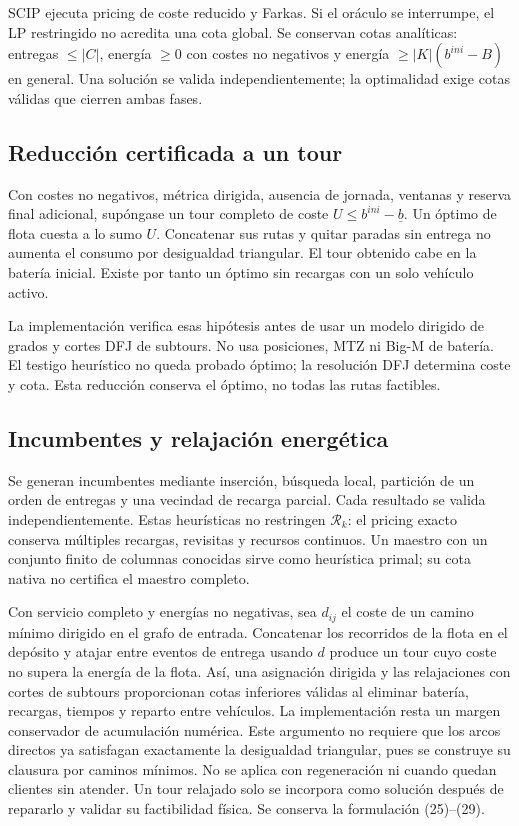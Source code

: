 \documentclass[11pt,a4paper]{article}
\newcommand{\reserve}{\underline b}
\begin{document}
SCIP ejecuta pricing de coste reducido y Farkas. Si el oráculo se interrumpe,
el LP restringido no acredita una cota global. Se conservan cotas analíticas:
entregas $\le |C|$, energía $\ge0$ con costes no negativos y
energía $\ge |K|(b^{ini}-B)$ en general. Una solución se valida independientemente;
la optimalidad exige cotas válidas que cierren ambas fases.

\subsection{Reducción certificada a un tour}
Con costes no negativos, métrica dirigida, ausencia de jornada, ventanas y
reserva final adicional, supóngase un tour completo de coste
$U\le b^{ini}-\reserve$. Un óptimo de flota cuesta a lo sumo $U$.
Concatenar sus rutas y quitar paradas sin entrega no aumenta el consumo por
desigualdad triangular. El tour obtenido cabe en la batería inicial.
Existe por tanto un óptimo sin recargas con un solo vehículo activo.

La implementación verifica esas hipótesis antes de usar un modelo dirigido
de grados y cortes DFJ de subtours. No usa posiciones, MTZ ni Big-M de batería.
El testigo heurístico no queda probado óptimo; la resolución DFJ determina
coste y cota. Esta reducción conserva el óptimo, no todas las rutas factibles.

\subsection{Incumbentes y relajación energética}
Se generan incumbentes mediante inserción, búsqueda local, partición de un
orden de entregas y una vecindad de recarga parcial. Cada resultado se valida
independientemente. Estas heurísticas no restringen $\mathcal R_k$: el pricing
exacto conserva múltiples recargas, revisitas y recursos continuos.
Un maestro con un conjunto finito de columnas conocidas sirve como heurística
primal; su cota nativa no certifica el maestro completo.

Con servicio completo y energías no negativas, sea $d_{ij}$ el coste de un
camino mínimo dirigido en el grafo de entrada. Concatenar los recorridos de
la flota en el depósito y atajar entre eventos de entrega usando $d$ produce
un tour cuyo coste no supera la energía de la flota. Así, una asignación
dirigida y las relajaciones con cortes de subtours proporcionan cotas inferiores
válidas al eliminar batería, recargas, tiempos y reparto entre vehículos.
La implementación resta un margen conservador de acumulación numérica.
Este argumento no requiere que los arcos directos ya satisfagan exactamente
la desigualdad triangular, pues se construye su clausura por caminos mínimos.
No se aplica con regeneración ni cuando quedan clientes sin atender.
Un tour relajado solo se incorpora como solución después de repararlo y validar
su factibilidad física. Se conserva la formulación (25)--(29).
\end{document}
